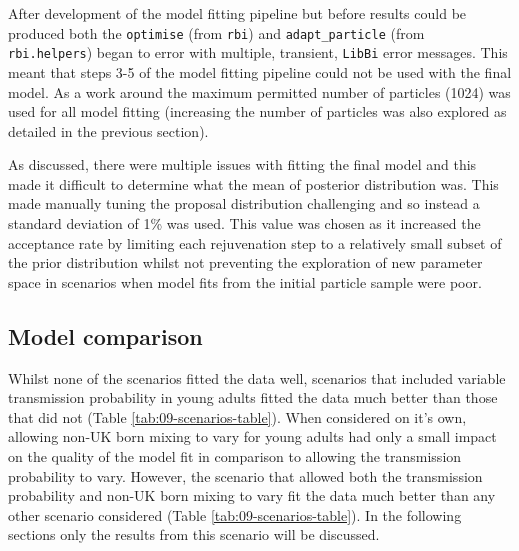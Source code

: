 \documentclass[11pt,twoside]{bristolthesis}
\begin{document}
  After development of the model fitting pipeline but before results could be produced both the \texttt{optimise} (from \texttt{rbi}) and \texttt{adapt\_particle} (from \texttt{rbi.helpers}) began to error with multiple, transient, \texttt{LibBi} error messages. This meant that steps 3-5 of the model fitting pipeline could not be used with the final model. As a work around the maximum permitted number of particles (1024) was used for all model fitting (increasing the number of particles was also explored as detailed in the previous section).
  
  As discussed, there were multiple issues with fitting the final model and this made it difficult to determine what the mean of posterior distribution was. This made manually tuning the proposal distribution challenging and so instead a standard deviation of 1\% was used. This value was chosen as it increased the acceptance rate by limiting each rejuvenation step to a relatively small subset of the prior distribution whilst not preventing the exploration of new parameter space in scenarios when model fits from the initial particle sample were poor.
  
  \hypertarget{model-comparison-1}{%
  \subsection{Model comparison}\label{model-comparison-1}}
  
  Whilst none of the scenarios fitted the data well, scenarios that included variable transmission probability in young adults fitted the data much better than those that did not (Table \ref{tab:09-scenarios-table}). When considered on it's own, allowing non-UK born mixing to vary for young adults had only a small impact on the quality of the model fit in comparison to allowing the transmission probability to vary. However, the scenario that allowed both the transmission probability and non-UK born mixing to vary fit the data much better than any other scenario considered (Table \ref{tab:09-scenarios-table}). In the following sections only the results from this scenario will be discussed.
  
\end{document}
